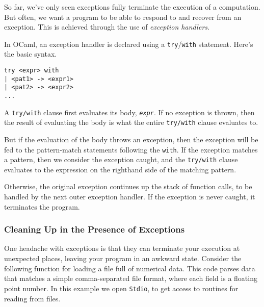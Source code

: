 So far, we've only seen exceptions fully terminate the execution of a
computation. But often, we want a program to be able to respond to and
recover from an exception. This is achieved through the use of
\emph{exception
handlers}.

In OCaml, an exception handler is declared using a
\passthrough{\lstinline!try!}/\passthrough{\lstinline!with!} statement.
Here's the basic syntax.

\begin{lstlisting}
try <expr> with
| <pat1> -> <expr1>
| <pat2> -> <expr2>
...
\end{lstlisting}

A \passthrough{\lstinline!try/with!} clause first evaluates its body,
\emph{\passthrough{\lstinline!expr!}}. If no exception is thrown, then
the result of evaluating the body is what the entire
\passthrough{\lstinline!try/with!} clause evaluates to.

But if the evaluation of the body throws an exception, then the
exception will be fed to the pattern-match statements following the
\passthrough{\lstinline!with!}. If the exception matches a pattern, then
we consider the exception caught, and the
\passthrough{\lstinline!try/with!} clause evaluates to the expression on
the righthand side of the matching pattern.

Otherwise, the original exception continues up the stack of function
calls, to be handled by the next outer exception handler. If the
exception is never caught, it terminates the program.

\hypertarget{cleaning-up-in-the-presence-of-exceptions}{%
\subsubsection{Cleaning Up in the Presence of
Exceptions}\label{cleaning-up-in-the-presence-of-exceptions}}

One headache with exceptions is that they can terminate your execution
at unexpected places, leaving your program in an awkward state. Consider
the following function for loading a file full of numerical data. This
code parses data that matches a simple comma-separated file format,
where each field is a floating point number. In this example we open
\passthrough{\lstinline!Stdio!}, to get access to routines for reading
from files. 

